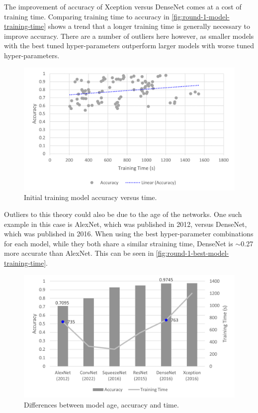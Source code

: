 The improvement of accuracy of Xception versus DenseNet comes at a cost of training time. Comparing training time to accuracy in \autoref{fig:round-1-model-training-time} shows a trend that a longer training time is generally necessary to improve accuracy. There are a number of outliers here however, as smaller models with the best tuned hyper-parameters outperform larger models with worse tuned hyper-parameters.

\begin{figure}[H]
    \centering
    \includegraphics[width=\textwidth]{figures/round-1-model-training-time2.png}
    \caption{Initial training model accuracy versus time.}
    \label{fig:round-1-model-training-time}
\end{figure}

Outliers to this theory could also be due to the age of the networks. One such example in this case is AlexNet, which was published in 2012, versus DenseNet, which was published in 2016. When using the best hyper-parameter combinations for each model, while they both share a similar straining time, DenseNet is $\sim$0.27 more accurate than AlexNet. This can be seen in \autoref{fig:round-1-best-model-training-time}.

\begin{figure}[H]
    \centering
    \includegraphics[width=\textwidth]{figures/round-1-best-model-training-time.png}
    \caption{Differences between model age, accuracy and time.}
    \label{fig:round-1-best-model-training-time}
\end{figure}

